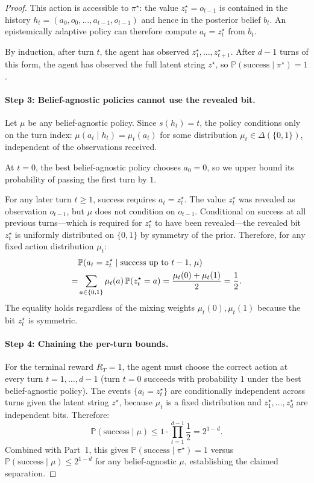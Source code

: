 \documentclass[11pt]{article}
\theoremstyle{plain}
\theoremstyle{definition}
\theoremstyle{remark}
\begin{document}
\begin{proof}
This action is accessible to $\pi^\star$: the value $z^\star_t = o_{t-1}$ 
is contained in the history $h_t = (a_0, o_0, \ldots, a_{t-1}, o_{t-1})$ 
and hence in the posterior belief $b_t$. An epistemically adaptive policy 
can therefore compute $a_t = z^\star_t$ from $b_t$.

By induction, after turn $t$, the agent has observed 
$z^\star_1, \ldots, z^\star_{t+1}$. After $d - 1$ turns of this form, 
the agent has observed the full latent string $z^\star$, so 
$\mathbb{P}(\mathrm{success} \mid \pi^\star) = 1$.

\paragraph{Step 3: Belief-agnostic policies cannot use the revealed bit.}
Let $\mu$ be any belief-agnostic policy. Since $s(h_t) = t$, the policy 
conditions only on the turn index: 
$\mu(a_t \mid h_t) = \mu_t(a_t)$ for some distribution 
$\mu_t \in \Delta(\{0,1\})$, independent of the observations received.

At $t = 0$, the best belief-agnostic policy chooses $a_0 = 0$, so we 
upper bound its probability of passing the first turn by $1$.

For any later turn $t \geq 1$, success requires $a_t = z^\star_t$. 
The value $z^\star_t$ was revealed as observation $o_{t-1}$, but $\mu$ 
does not condition on $o_{t-1}$. Conditional on success at all previous 
turns---which is required for $z^\star_t$ to have been revealed---the 
revealed bit $z^\star_t$ is uniformly distributed on $\{0,1\}$ by symmetry 
of the prior. Therefore, for any fixed action distribution $\mu_t$:
\begin{align}
    &\notag\mathbb{P}(a_t = z^\star_t \mid \mathrm{success\ up\ to\ } t-1,\, \mu)
    \\=&
    \sum_{a \in \{0,1\}} \mu_t(a)\,\mathbb{P}(z^\star_t = a)
    =
    \frac{\mu_t(0) + \mu_t(1)}{2}
    = \frac{1}{2}.
\end{align}
The equality holds regardless of the mixing weights $\mu_t(0), \mu_t(1)$ 
because the bit $z^\star_t$ is symmetric.

\paragraph{Step 4: Chaining the per-turn bounds.}
For the terminal reward $R_T = 1$, the agent must choose the correct 
action at every turn $t = 1, \ldots, d-1$ (turn $t = 0$ succeeds 
with probability $1$ under the best belief-agnostic policy). The 
events $\{a_t = z^\star_t\}$ are conditionally independent across turns 
given the latent string $z^\star$, because $\mu_t$ is a fixed distribution 
and $z^\star_1, \ldots, z^\star_d$ are independent bits. Therefore:
\[
    \mathbb{P}(\mathrm{success} \mid \mu)
    \leq
    1 \cdot \prod_{t=1}^{d-1} \frac{1}{2}
    =
    2^{1-d}.
\]
Combined with Part~1, this gives $\mathbb{P}(\mathrm{success} \mid \pi^\star) 
= 1$ versus $\mathbb{P}(\mathrm{success} \mid \mu) \leq 2^{1-d}$ for any 
belief-agnostic $\mu$, establishing the claimed separation.


\end{proof}
\end{document}
